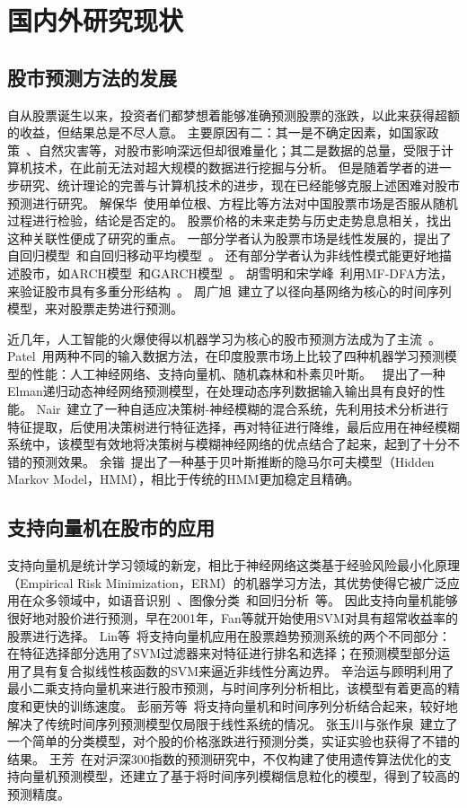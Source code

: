 \documentclass[a4paper,12pt]{Proposal}
\begin{document}
\section{国内外研究现状}
\subsection{股市预测方法的发展}
自从股票诞生以来，投资者们都梦想着能够准确预测股票的涨跌，以此来获得超额的收益，但结果总是不尽人意。
主要原因有二：其一是不确定因素，如国家政策~\citep{cn5}、自然灾害等，对股市影响深远但却很难量化；其二是数据的总量，受限于计算机技术，在此前无法对超大规模的数据进行挖掘与分析。
但是随着学者的进一步研究、统计理论的完善与计算机技术的进步，现在已经能够克服上述困难对股市预测进行研究。
解保华~\citep{cn6}使用单位根、方程比等方法对中国股票市场是否服从随机过程进行检验，结论是否定的。
股票价格的未来走势与历史走势息息相关，找出这种关联性便成了研究的重点。
一部分学者认为股票市场是线性发展的，提出了自回归模型~\citep{cn7}和自回归移动平均模型~\citep{cn8}。
还有部分学者认为非线性模式能更好地描述股市，如ARCH模型~\citep{cn9}和GARCH模型~\citep{cn10}。
胡雪明和宋学峰~\citep{cn11}利用MF-DFA方法，来验证股市具有多重分形结构~\citep{cn11}。
周广旭~\citep{cn12}建立了以径向基网络为核心的时间序列模型，来对股票走势进行预测。

近几年，人工智能的火爆使得以机器学习为核心的股市预测方法成为了主流~\citep{cn13}。
Patel~\citep{en2}用两种不同的输入数据方法，在印度股票市场上比较了四种机器学习预测模型的性能：人工神经网络、支持向量机、随机森林和朴素贝叶斯。
~\citep{cn14}提出了一种Elman递归动态神经网络预测模型，在处理动态序列数据输入输出具有良好的性能。
Nair~\citep{en3}建立了一种自适应决策树-神经模糊的混合系统，先利用技术分析进行特征提取，后使用决策树进行特征选择，再对特征进行降维，最后应用在神经模糊系统中，该模型有效地将决策树与模糊神经网络的优点结合了起来，起到了十分不错的预测效果。
余锴~\citep{cn15}提出了一种基于贝叶斯推断的隐马尔可夫模型（Hidden Markov Model，HMM），相比于传统的HMM更加稳定且精确。
\subsection{支持向量机在股市的应用}
支持向量机是统计学习领域的新宠，相比于神经网络这类基于经验风险最小化原理（Empirical Risk Minimization，ERM）的机器学习方法，其优势使得它被广泛应用在众多领域中，如语音识别~\citep{en4}、图像分类~\citep{en5}和回归分析~\citep{cn16}等。
因此支持向量机能够很好地对股价进行预测，早在2001年，Fan等\citep{en6}就开始使用SVM对具有超常收益率的股票进行选择。
Lin等~\citep{en7}将支持向量机应用在股票趋势预测系统的两个不同部分：在特征选择部分选用了SVM过滤器来对特征进行排名和选择；在预测模型部分运用了具有复合拟线性核函数的SVM来逼近非线性分离边界。
辛治运与顾明\citep{cn17}利用了最小二乘支持向量机来进行股市预测，与时间序列分析相比，该模型有着更高的精度和更快的训练速度。
彭丽芳等~\citep{cn18}将支持向量机和时间序列分析结合起来，较好地解决了传统时间序列预测模型仅局限于线性系统的情况。
张玉川与张作泉~\citep{cn19}建立了一个简单的分类模型，对个股的价格涨跌进行预测分类，实证实验也获得了不错的结果。
王芳~\citep{cn20}在对沪深300指数的预测研究中，不仅构建了使用遗传算法优化的支持向量机预测模型，还建立了基于将时间序列模糊信息粒化的模型，得到了较高的预测精度。
\end{document}
